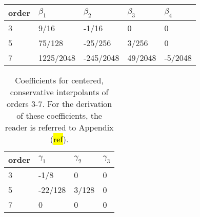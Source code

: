 \documentclass[]{article}
\begin{document}
        \begin{table}[]
            \center
            \begin{tabular}{|l|l|l|l|l|}
            \hline
                order    & $\beta_{1}$ & $\beta_{2}$ & $\beta_{3}$ & $\beta_{4}$ \\ \hline
                3 & 9/16         & -1/16        & 0            & 0 \\ \hline
                5 & 75/128       & -25/256      & 3/256        & 0 \\ \hline
                7 & 1225/2048    & -245/2048    & 49/2048      & -5/2048 \\ \hline
            \end{tabular}
            \label{coeff2}
            \caption{}
        \end{table}
        \begin{table}
            \center
            \begin{tabular}{|l|l|l|l|}
            \hline
                order    & $\gamma_{1}$ & $\gamma_{2}$ & $\gamma_{3}$ \\ \hline
                3 & -1/8          & 0            & 0            \\ \hline
                5 & -22/128      & 3/128        & 0            \\ \hline
                7 & 0            & 0            & 0            \\ \hline
            \end{tabular}
            \label{coeff1}
            \caption{Coefficients for centered, conservative interpolants of
                orders 3-7. For the derivation of these coefficients, the reader is referred to Appendix (\hl{ref}).}
        \end{table}
%
\end{document}
